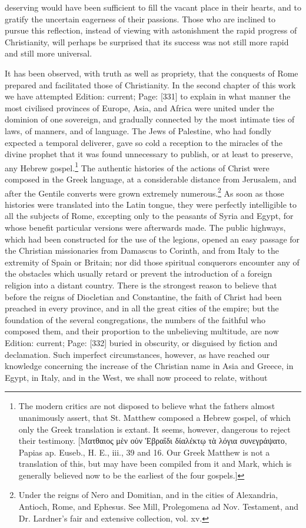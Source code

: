 deserving would have been sufficient to fill the vacant place in their hearts, and to gratify the uncertain eagerness of their passions. Those who are inclined to pursue this reflection, instead of viewing with astonishment the rapid progress of Christianity, will perhaps be surprised that its success was not still more rapid and still more universal.

It has been observed, with truth as well as propriety, that the conquests of Rome prepared and facilitated those of Christianity. In the second chapter of this work we have attempted Edition: current; Page: [331] to explain in what manner the most civilised provinces of Europe, Asia, and Africa were united under the dominion of one sovereign, and gradually connected by the most intimate ties of laws, of manners, and of language. The Jews of Palestine, who had fondly expected a temporal deliverer, gave so cold a reception to the miracles of the divine prophet that it was found unnecessary to publish, or at least to preserve, any Hebrew gospel.\footnote{The modern critics are not disposed to believe what the fathers almost unanimously assert, that St. Matthew composed a Hebrew gospel, of which only the Greek translation is extant. It seems, however, dangerous to reject their testimony. [\textgreek{Ματθαιος μ\texthebrew{ὲ}ν ο\texthebrew{ὐ}ν \texthebrew{Ἑ}βραΐδι δίαλέκτ\texthebrew{ῳ} τ\texthebrew{ὰ} λόγια συνεγράψατο}, Papias ap. Euseb., H. E., iii., 39 and 16. Our Greek Matthew is not a translation of this, but may have been compiled from it and Mark, which is generally believed now to be the earliest of the four gospels.]} The authentic histories of the actions of Christ were composed in the Greek language, at a considerable distance from Jerusalem, and after the Gentile converts were grown extremely numerous.\footnote{Under the reigns of Nero and Domitian, and in the cities of Alexandria, Antioch, Rome, and Ephesus. See Mill, Prolegomena ad Nov. Testament, and Dr. Lardner\texthebrew{}’s fair and extensive collection, vol. xv.} As soon as those histories were translated into the Latin tongue, they were perfectly intelligible to all the subjects of Rome, excepting only to the peasants of Syria and Egypt, for whose benefit particular versions were afterwards made. The public highways, which had been constructed for the use of the legions, opened an easy passage for the Christian missionaries from Damascus to Corinth, and from Italy to the extremity of Spain or Britain; nor did those spiritual conquerors encounter any of the obstacles which usually retard or prevent the introduction of a foreign religion into a distant country. There is the strongest reason to believe that before the reigns of Diocletian and Constantine, the faith of Christ had been preached in every province, and in all the great cities of the empire; but the foundation of the several congregations, the numbers of the faithful who composed them, and their proportion to the unbelieving multitude, are now Edition: current; Page: [332] buried in obscurity, or disguised by fiction and declamation. Such imperfect circumstances, however, as have reached our knowledge concerning the increase of the Christian name in Asia and Greece, in Egypt, in Italy, and in the West, we shall now proceed to relate, without 